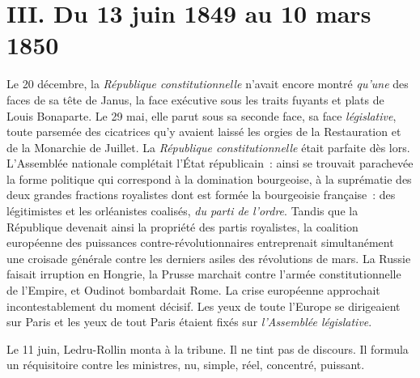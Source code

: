 \documentclass[twoside]{book} %
\newcommand\chaptercont{} %
\begin{document}
\chapter[{III. Du 13 juin 1849 au 10 mars 1850}]{III. Du 13 juin 1849 au 10 mars 1850}
\renewcommand{\leftmark}{III. Du 13 juin 1849 au 10 mars 1850}


\chaptercont
\noindent Le 20 décembre, la \emph{République constitutionnelle} n’avait encore montré \emph{qu’une} des faces de sa tête de Janus, la face exécutive sous les traits fuyants et plats de Louis Bonaparte. Le 29 mai, elle parut sous sa seconde face, sa face \emph{législative}, toute parsemée des cicatrices qu’y avaient laissé les orgies de la Restauration et de la Monarchie de Juillet. La \emph{République constitutionnelle} était parfaite dès lors. L’Assemblée nationale complétait l’État républicain : ainsi se trouvait parachevée la forme politique qui correspond à la domination bourgeoise, à la suprématie des deux grandes fractions royalistes dont est formée la bourgeoisie française : des légitimistes et les orléanistes coalisés, \emph{du parti de l’ordre}. Tandis que la République devenait ainsi la propriété des partis royalistes, la coalition européenne des puissances contre-révolutionnaires entreprenait simultanément une croisade générale contre les derniers asiles des révolutions de mars. La Russie faisait irruption en Hongrie, la Prusse marchait contre l’armée constitutionnelle de l’Empire, et Oudinot bombardait Rome. La crise européenne approchait incontestablement du moment décisif. Les yeux de toute l’Europe se dirigeaient sur Paris et les yeux de tout Paris étaient fixés sur \emph{l’Assemblée législative}.\par
Le 11 juin, Ledru-Rollin monta à la tribune. Il ne tint pas de discours. Il formula un réquisitoire contre les ministres, nu, simple, réel, concentré, puissant.\par
\end{document}
